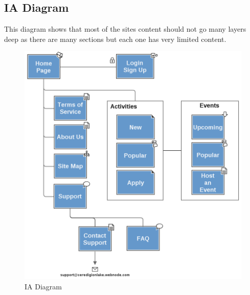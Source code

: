 \documentclass{article}
\begin{document}
\subsection{IA Diagram}
This diagram shows that most of the sites content should not go many layers deep as there are many sections but each one has very limited content.
\begin{figure}[h]
\centering
        \includegraphics[width=5.0in] {IA.png}
        \caption{IA Diagram}
        \label{IA Diagram}
\end{figure}

\end{document}
